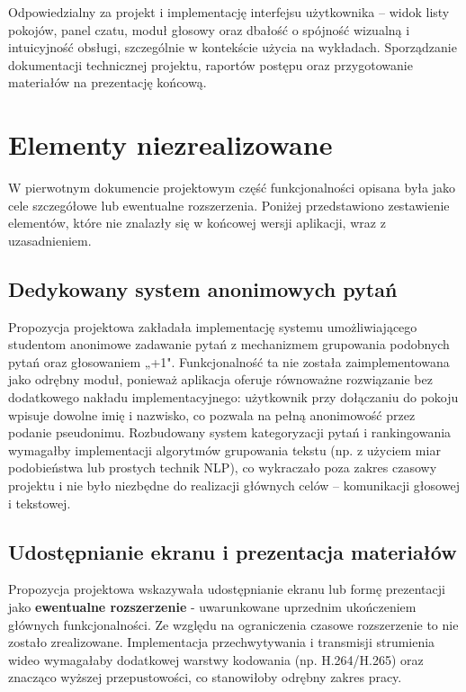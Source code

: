 Odpowiedzialny za projekt i implementację interfejsu użytkownika --
widok listy pokojów, panel czatu, moduł głosowy oraz dbałość o spójność
wizualną i intuicyjność obsługi, szczególnie w kontekście użycia
na wykładach. Sporządzanie dokumentacji technicznej projektu, raportów
postępu oraz przygotowanie materiałów na prezentację końcową.

\section{Elementy niezrealizowane}
\label{sec:not_implemented}

W pierwotnym dokumencie projektowym część funkcjonalności opisana była jako
cele szczegółowe lub ewentualne rozszerzenia. Poniżej przedstawiono
zestawienie elementów, które nie znalazły się w końcowej wersji
aplikacji, wraz z uzasadnieniem.

\subsection*{Dedykowany system anonimowych pytań}

Propozycja projektowa zakładała implementację systemu umożliwiającego
studentom anonimowe zadawanie pytań z mechanizmem grupowania podobnych
pytań oraz głosowaniem „+1". Funkcjonalność ta nie została zaimplementowana
jako odrębny moduł, ponieważ aplikacja oferuje równoważne rozwiązanie
bez dodatkowego nakładu implementacyjnego: użytkownik przy dołączaniu
do pokoju wpisuje dowolne imię i nazwisko, co pozwala na pełną anonimowość
przez podanie pseudonimu. Rozbudowany system kategoryzacji pytań
i rankingowania wymagałby implementacji algorytmów grupowania tekstu
(np. z użyciem miar podobieństwa lub prostych technik NLP), co wykraczało
poza zakres czasowy projektu i nie było niezbędne do realizacji głównych
celów -- komunikacji głosowej i tekstowej.

\subsection*{Udostępnianie ekranu i prezentacja materiałów}

Propozycja projektowa wskazywała udostępnianie ekranu lub formę
prezentacji jako \textbf{ewentualne rozszerzenie} - uwarunkowane
uprzednim ukończeniem głównych funkcjonalności. Ze względu na ograniczenia
czasowe rozszerzenie to nie zostało zrealizowane. Implementacja
przechwytywania i transmisji strumienia wideo wymagałaby dodatkowej
warstwy kodowania (np. H.264/H.265) oraz znacząco wyższej przepustowości,
co stanowiłoby odrębny zakres pracy.

